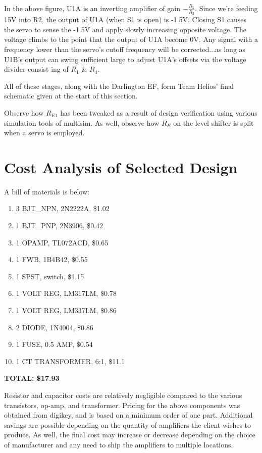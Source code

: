 \documentclass[journal]{IEEEtran}
\begin{document}
In the above figure, U1A is an inverting amplifier of gain $-\frac{R_{5}}{R_{2}}$. Since we’re feeding 15V into R2, 
the output of U1A (when S1 is open) is -1.5V. Closing S1 causes the servo to sense the -1.5V and apply
slowly increasing opposite voltage. The voltage climbs to the point that the output of U1A become
0V. Any signal with a frequency lower than the servo’s cutoff frequency will be corrected...as long
as U1B’s output can swing sufficient large to adjust U1A’s offsets via the voltage divider consist
ing of $R_{1}$ \& $R_{4}$.

All of these stages, along with the Darlington EF, form Team Helios' final schematic given at the
start of this section.

Observe how $R_{E1}$ has been tweaked as a result of design verification using various simulation tools of
multisim. As well, observe how $R_{E}$ on the level shifter is split when a servo is employed.

\section{Cost Analysis of Selected Design}

A bill of materials is below:

\begin{enumerate}
\item
3 BJT\_NPN, 2N2222A, \$1.02
\item
1 BJT\_PNP, 2N3906, \$0.42
\item
1 OPAMP, TL072ACD, \$0.65
\item
1 FWB, 1B4B42, \$0.55
\item
1 SPST, switch, \$1.15
\item
1 VOLT REG, LM317LM, \$0.78
\item
1 VOLT REG, LM337LM, \$0.86
\item
2 DIODE, 1N4004, \$0.86
\item
1 FUSE, 0.5 AMP, \$0.54
\item
1 CT TRANSFORMER, 6:1, \$11.1
\end{enumerate}

\textbf{TOTAL: \$17.93}

Resistor and capacitor costs are relatively negligible compared to the various transistors, op-amp, and transformer. 
Pricing for the above components was obtained from digikey, and is based on a minimum order of one part.
Additional savings are possible depending on the quantity of amplifiers the client wishes to produce.
As well, the final cost may increase or decrease depending on the choice of manufacturer and any need to
ship the amplifiers to multiple locations.
\end{document}
